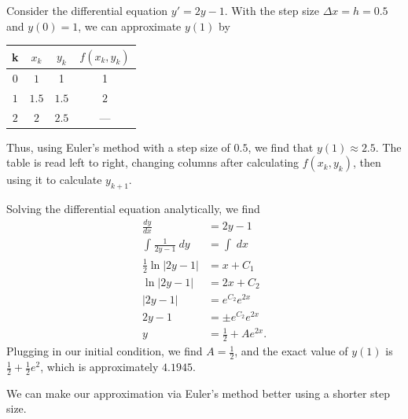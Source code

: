 \documentclass[10pt]{mypackage}
\begin{document}
\begin{example}
  Consider the differential equation $y' = 2y-1$. With the step size $\Delta x = h = 0.5$ and $y(0) = 1$, we can approximate $y(1)$ by
  \begin{center}
    \begin{tabular}{c|c|c|c}
      k & $x_k$ & $y_k$ & $f\left(x_k,y_k\right)$\\
      \hline
      $0$ & $1$ & 1 & 1\\
      $1$ & $1.5$ & $1.5$ & $2$\\
      $2$ & $2$ & $2.5$ & ---
    \end{tabular}
  \end{center}
  Thus, using Euler's method with a step size of $0.5$, we find that $y(1)\approx 2.5$. The table is read left to right, changing columns after calculating $f\left(x_k,y_k\right)$, then using it to calculate $y_{k+1}$.\newline

  Solving the differential equation analytically, we find
  \begin{align*}
    \frac{dy}{dx} &= 2y-1\\
    \int_{}^{} \frac{1}{2y-1}\:dy &= \int_{}^{} \:dx\\
    \frac{1}{2}\ln\left\vert 2y-1 \right\vert &= x + C_1\\
    \ln\left\vert 2y-1 \right\vert &= 2x + C_2\\
    \left\vert 2y-1 \right\vert &= e^{C_2}e^{2x}\\
    2y-1 &= \pm e^{C_2}e^{2x}\\
    y &= \frac{1}{2} + Ae^{2x}.
  \end{align*}
  Plugging in our initial condition, we find $A = \frac{1}{2}$, and the exact value of $y(1)$ is $\frac{1}{2} + \frac{1}{2}e^2$, which is approximately $4.1945$.\newline

  We can make our approximation via Euler's method better using a shorter step size.\newline


\end{example}
\end{document}
